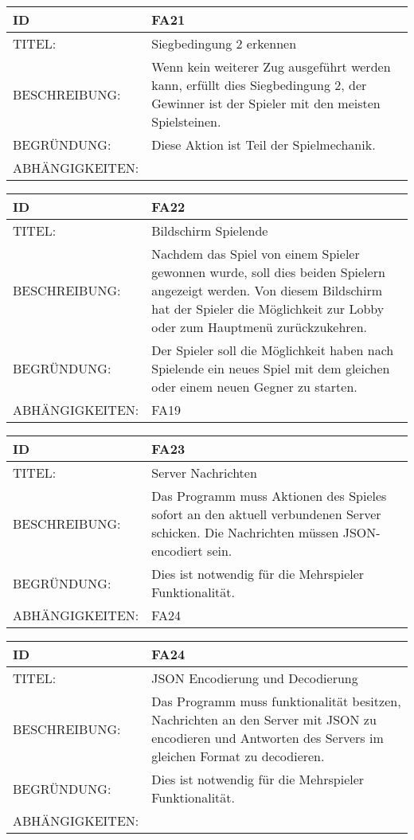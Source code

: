 \documentclass{uulm-assignment}
\begin{document}
\begin{tabularx}{16cm}{l|X}
\textbf{ID} & \textbf{FA21} \\
\hline
TITEL: & Siegbedingung 2 erkennen \\
\hline
BESCHREIBUNG: & Wenn kein weiterer Zug ausgeführt werden kann, erfüllt dies Siegbedingung 2, der Gewinner ist der Spieler mit den meisten Spielsteinen.
\\
\hline
BEGRÜNDUNG: & Diese Aktion ist Teil der Spielmechanik. \\
\hline
ABHÄNGIGKEITEN: & \\
\end{tabularx}

\begin{tabularx}{16cm}{l|X}
\textbf{ID} & \textbf{FA22} \\
\hline
TITEL: & Bildschirm Spielende\\
\hline
BESCHREIBUNG: & Nachdem das Spiel von einem Spieler gewonnen wurde, soll dies beiden Spielern angezeigt werden.
Von diesem Bildschirm hat der Spieler die Möglichkeit zur Lobby oder zum Hauptmenü zurückzukehren.
\\
\hline
BEGRÜNDUNG: & Der Spieler soll die Möglichkeit haben nach Spielende ein neues Spiel mit dem gleichen oder einem neuen Gegner zu starten.\\
\hline
ABHÄNGIGKEITEN: & FA19 \\
\end{tabularx}


\begin{tabularx}{16cm}{l|X}
\textbf{ID} & \textbf{FA23} \\
\hline
TITEL: & Server Nachrichten\\
\hline
BESCHREIBUNG: & Das Programm muss Aktionen des Spieles sofort an den aktuell verbundenen Server schicken. Die Nachrichten müssen JSON-encodiert sein.
\\
\hline
BEGRÜNDUNG: & Dies ist notwendig für die Mehrspieler Funktionalität. \\
\hline
ABHÄNGIGKEITEN: & FA24 \\
\end{tabularx}

\begin{tabularx}{16cm}{l|X}
\textbf{ID} & \textbf{FA24} \\
\hline
TITEL: & JSON Encodierung und Decodierung\\
\hline
BESCHREIBUNG: & Das Programm muss funktionalität besitzen, Nachrichten an den Server mit JSON zu encodieren und Antworten des Servers im gleichen Format zu decodieren.
\\
\hline
BEGRÜNDUNG: & Dies ist notwendig für die Mehrspieler Funktionalität. \\
\hline
ABHÄNGIGKEITEN: & \\
\end{tabularx}
\end{document}
